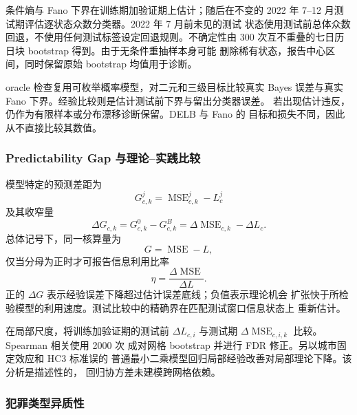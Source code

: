 条件熵与 Fano 下界在训练期加验证期上估计；随后在不变的
2022 年 7--12 月测试期评估逐状态众数分类器。2022 年 7 月前未见的测试
状态使用测试前总体众数回退，不使用任何测试标签设定回退规则。不确定性由
300 次互不重叠的七日历日块 bootstrap 得到。由于无条件重抽样本身可能
删除稀有状态，报告中心区间，同时保留原始 bootstrap 均值用于诊断。

oracle 检查复用可枚举概率模型，对二元和三级目标比较真实 Bayes
误差与真实 Fano 下界。经验比较则是估计测试前下界与留出分类器误差。
若出现估计违反，仍作为有限样本或分布漂移诊断保留。DELB 与 Fano 的
目标和损失不同，因此从不直接比较其数值。

\subsubsection{Predictability Gap 与理论--实践比较}
\label{subsec:gap_methods}
\label{subsec:gap_efficiency}

模型特定的预测差距为
\begin{equation}
G^j_{c,k}=\operatorname{MSE}^{j}_{c,k}-L^j_c
\label{eq:empirical_gap}
\end{equation}
及其收窄量
\begin{equation}
\Delta G_{c,k}
=G^0_{c,k}-G^B_{c,k}
=\Delta\operatorname{MSE}_{c,k}-\Delta L_c.
\label{eq:empirical_gap_narrowing}
\end{equation}
总体记号下，同一核算量为
\begin{equation}
G=\operatorname{MSE}-L,
\label{eq:prediction_gap}
\end{equation}
仅当分母为正时才可报告信息利用比率
\begin{equation}
\eta=\frac{\Delta\operatorname{MSE}}{\Delta L}.
\label{eq:bound_efficiency}
\end{equation}
正的 \(\Delta G\) 表示经验误差下降超过估计误差底线；负值表示理论机会
扩张快于所检验模型的利用速度。测试比较中的精确界在匹配测试窗口信息状态上
重新估计。

在局部尺度，将训练加验证期的测试前 \(\Delta L_{c,i}\) 与测试期
\(\Delta\operatorname{MSE}_{c,i,k}\) 比较。Spearman 相关使用 2000 次
成对网格 bootstrap 并进行 FDR 修正。另以城市固定效应和 HC3 标准误的
普通最小二乘模型回归局部经验改善对局部理论下降。该分析是描述性的，
回归协方差未建模跨网格依赖。

\subsubsection{犯罪类型异质性}
\label{subsec:crime_type_methods}

